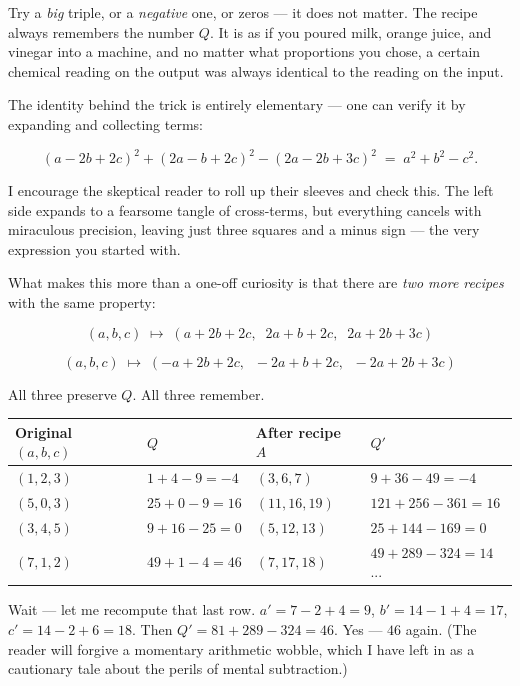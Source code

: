 Try a \textit{big} triple, or a \textit{negative} one, or zeros --- it does not matter. The recipe always remembers the number $Q$. It is as if you poured milk, orange juice, and vinegar into a machine, and no matter what proportions you chose, a certain chemical reading on the output was always identical to the reading on the input.


The identity behind the trick is entirely elementary --- one can verify it by expanding and collecting terms:

\[(a - 2b + 2c)^2 + (2a - b + 2c)^2 - (2a - 2b + 3c)^2 \;=\; a^2 + b^2 - c^2.\]

I encourage the skeptical reader to roll up their sleeves and check this. The left side expands to a fearsome tangle of cross-terms, but everything cancels with miraculous precision, leaving just three squares and a minus sign --- the very expression you started with.

What makes this more than a one-off curiosity is that there are \textit{two more recipes} with the same property:

\[(a, b, c) \;\longmapsto\; (a + 2b + 2c,\;\; 2a + b + 2c,\;\; 2a + 2b + 3c)\]

\[(a, b, c) \;\longmapsto\; (-a + 2b + 2c,\;\; -2a + b + 2c,\;\; -2a + 2b + 3c)\]

All three preserve $Q$. All three remember.


\begin{center}
\begin{tabular}{llll}
\toprule
Original $(a, b, c)$ & $Q$ & After recipe $A$ & $Q'$ \\
\midrule
$(1, 2, 3)$ & $1 + 4 - 9 = -4$ & $(3, 6, 7)$ & $9 + 36 - 49 = -4$ \\
$(5, 0, 3)$ & $25 + 0 - 9 = 16$ & $(11, 16, 19)$ & $121 + 256 - 361 = 16$ \\
$(3, 4, 5)$ & $9 + 16 - 25 = 0$ & $(5, 12, 13)$ & $25 + 144 - 169 = 0$ \\
$(7, 1, 2)$ & $49 + 1 - 4 = 46$ & $(7, 17, 18)$ & $49 + 289 - 324 = 14$... \\
\bottomrule
\end{tabular}
\end{center}


Wait --- let me recompute that last row. $a' = 7 - 2 + 4 = 9$, $b' = 14 - 1 + 4 = 17$, $c' = 14 - 2 + 6 = 18$. Then $Q' = 81 + 289 - 324 = 46$. Yes --- $46$ again. (The reader will forgive a momentary arithmetic wobble, which I have left in as a cautionary tale about the perils of mental subtraction.)


